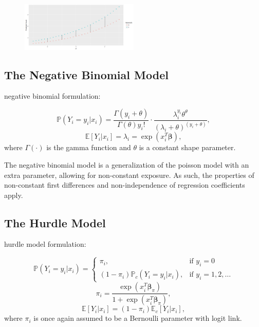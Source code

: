 \documentclass[jou, apacite]{apa6}
\begin{document}
\begin{figure}[h]
\includegraphics[width=0.5\textwidth]{PoissonFirstDiff.png}
\end{figure}

\subsection{The Negative Binomial Model}

negative binomial formulation:

\begin{equation}
\mathbb{P}(Y_i = y_i | x_i) = \dfrac{\Gamma(y_i + \theta)}{\Gamma(\theta)y_i!}
  \cdot
  \dfrac{\lambda_i^{y_i}\theta^{\theta}}{(\lambda_i + \theta)^{(y_i + \theta)}},
\end{equation}
\begin{equation}
\mathbb{E}[Y_i|x_i] = \lambda_i = \exp (x_i^T \bm{\beta}),
\end{equation}
where $\Gamma(\cdot)$ is the gamma function and $\theta$ is a constant shape parameter.

The negative binomial model is a generalization of the poisson model with an extra parameter, allowing for non-constant exposure. As such, the properties of non-constant first differences and non-independence of regression coefficients apply. 


\subsection{The Hurdle Model}

hurdle model formulation:

\begin{equation}
\mathbb{P}(Y_i = y_i|x_i) =
  \begin{cases}
    \pi_i, & \text{if } y_i = 0 \\
    (1 - \pi_i)\mathbb{P}_c(Y_i = y_i|x_i), & \text{if } y_i = 1, 2, \dots
  \end{cases}
\end{equation}
\begin{equation}
\pi_i = \dfrac{\exp (x_i^T \bm{\beta}_{\pi})}{1 + \exp (x_i^T \bm{\beta}_{\pi})},
\end{equation}
\begin{equation}
\mathbb{E}[Y_i|x_i] = (1 - \pi_i)\mathbb{E}_c[Y_i|x_i], %
\end{equation}
where $\pi_i$ is once again assumed to be a Bernoulli parameter with logit link.
\end{document}
